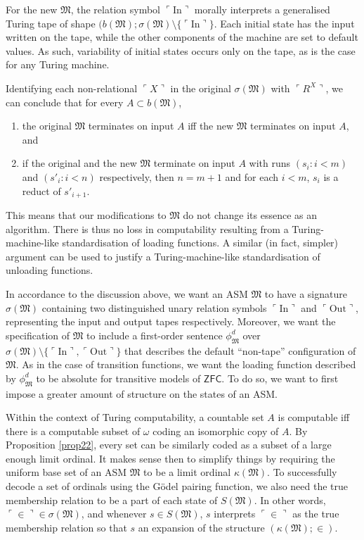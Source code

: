 \documentclass[12pt, twoside]{memoir}
\numberwithin{equation}{section}
\theoremstyle{definition}
\theoremstyle{remark}
\theoremstyle{definition}
\theoremstyle{definition}
\theoremstyle{definition}
\theoremstyle{remark}
\begin{document}
For the new $\mathfrak{M}$, the relation symbol $\ulcorner \mathrm{In} \urcorner$ morally interprets a generalised Turing tape of shape $(b(\mathfrak{M}); \sigma(\mathfrak{M}) \setminus \{\ulcorner \mathrm{In} \urcorner\}$. Each initial state has the input written on the tape, while the other components of the machine are set to default values. As such, variability of initial states occurs only on the tape, as is the case for any Turing machine. 

Identifying each non-relational $\ulcorner X \urcorner$ in the original $\sigma(\mathfrak{M})$ with $\ulcorner R^X \urcorner$, we can conclude that for every $A \subset b(\mathfrak{M})$, 
\begin{enumerate}[label=(\arabic*)]
    \item the original $\mathfrak{M}$ terminates on input $A$ iff the new $\mathfrak{M}$ terminates on input $A$, and
    \item if the original and the new $\mathfrak{M}$ terminate on input $A$ with runs $(s_i : i < m)$ and $(s'_i : i < n)$ respectively, then $n = m + 1$ and for each $i < m$, $s_i$ is a reduct of $s'_{i+1}$.
\end{enumerate} 
This means that our modifications to $\mathfrak{M}$ do not change its essence as an algorithm. There is thus no loss in computability resulting from a Turing-machine-like standardisation of loading functions. A similar (in fact, simpler) argument can be used to justify a Turing-machine-like standardisation of unloading functions.

In accordance to the discussion above, we want an ASM $\mathfrak{M}$ to have a signature $\sigma(\mathfrak{M})$ containing two distinguished unary relation symbols $\ulcorner \mathrm{In} \urcorner$ and $\ulcorner \mathrm{Out} \urcorner$, representing the input and output tapes respectively. Moreover, we want the specification of $\mathfrak{M}$ to include a first-order sentence $\phi^d_{\mathfrak{M}}$ over $\sigma(\mathfrak{M}) \setminus \{\ulcorner \mathrm{In} \urcorner, \ulcorner \mathrm{Out} \urcorner\}$ that describes the default ``non-tape'' configuration of $\mathfrak{M}$. As in the case of transition functions, we want the loading function described by $\phi^d_{\mathfrak{M}}$ to be absolute for transitive models of $\mathsf{ZFC}$. To do so, we want to first impose a greater amount of structure on the states of an ASM.

Within the context of Turing computability, a countable set $A$ is computable iff there is a computable subset of $\omega$ coding an isomorphic copy of $A$. By Proposition \ref{prop22}, every set can be similarly coded as a subset of a large enough limit ordinal. It makes sense then to simplify things by requiring the uniform base set of an ASM $\mathfrak{M}$ to be a limit ordinal $\kappa(\mathfrak{M})$. To successfully decode a set of ordinals using the G\"{o}del pairing function, we also need the true membership relation to be a part of each state of $S(\mathfrak{M})$. In other words, $\ulcorner \in \urcorner \in \sigma(\mathfrak{M})$, and whenever $s \in S(\mathfrak{M})$, $s$ interprets $\ulcorner \in \urcorner$ as the true membership relation so that $s$ an expansion of the structure $(\kappa(\mathfrak{M}); \in)$.
\end{document}
